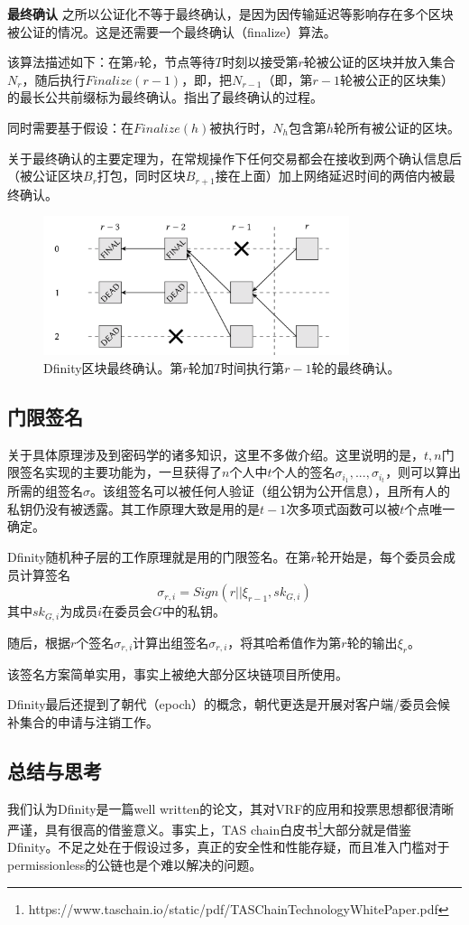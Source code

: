 \textbf{最终确认}
之所以公证化不等于最终确认，是因为因传输延迟等影响存在多个区块被公证的情况。这是还需要一个最终确认（finalize）算法。

该算法描述如下：在第$r$轮，节点等待$T$时刻以接受第$r$轮被公证的区块并放入集合$N_{r}$，随后执行$Finalize(r-1)$，即，把$N_{r-1}$（即，第$r-1$轮被公正的区块集）的最长公共前缀标为最终确认。指出了最终确认的过程。

同时需要基于假设：在$Finalize(h)$被执行时，$N_h$包含第$h$轮所有被公证的区块。

关于最终确认的主要定理为，在常规操作下任何交易都会在接收到两个确认信息后（被公证区块$B_r$打包，同时区块$B_{r+1}$接在上面）加上网络延迟时间的两倍内被最终确认。

\begin{figure}
	\centering
	\includegraphics[width=0.8\textwidth]{../common/Dfinity_2.png}
	\caption{Dfinity区块最终确认。第$r$轮加$T$时间执行第$r-1$轮的最终确认。} 		
	\label{fig:Dfinity2}
\end{figure}

\subsection{门限签名}
关于具体原理涉及到密码学的诸多知识，这里不多做介绍。这里说明的是，$t,n$门限签名实现的主要功能为，一旦获得了$n$个人中$t$个人的签名$\sigma_{i_1},...,\sigma_{i_t}$，则可以算出所需的组签名$\sigma$。该组签名可以被任何人验证（组公钥为公开信息），且所有人的私钥仍没有被透露。其工作原理大致是用的是$t-1$次多项式函数可以被$t$个点唯一确定。

Dfinity随机种子层的工作原理就是用的门限签名。在第$r$轮开始是，每个委员会成员计算签名
$$\sigma_{r,i}=Sign(r||\xi_{r-1},sk_{G,i})$$
其中$sk_{G,i}$为成员$i$在委员会$G$中的私钥。

随后，根据$r$个签名$\sigma_{r,i}$计算出组签名$\sigma_{r,i}$，将其哈希值作为第$r$轮的输出$\xi_r$。

该签名方案简单实用，事实上被绝大部分区块链项目所使用。

Dfinity最后还提到了朝代（epoch）的概念，朝代更迭是开展对客户端/委员会候补集合的申请与注销工作。
\subsection{总结与思考}
我们认为Dfinity是一篇well written的论文，其对VRF的应用和投票思想都很清晰严谨，具有很高的借鉴意义。事实上，TAS chain白皮书\footnote{https://www.taschain.io/static/pdf/TASChainTechnologyWhitePaper.pdf}大部分就是借鉴Dfinity。不足之处在于假设过多，真正的安全性和性能存疑，而且准入门槛对于permissionless的公链也是个难以解决的问题。
